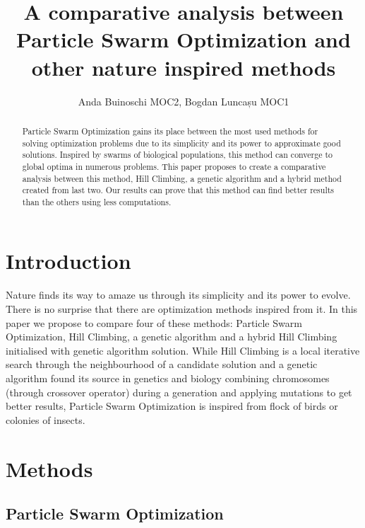 \documentclass{article}
\title{A comparative analysis between Particle Swarm Optimization and other nature inspired methods}
\author{Anda Buinoschi MOC2, Bogdan Luncașu MOC1 }
\date{}
\begin{document}
\maketitle

\begin{abstract}
Particle Swarm Optimization gains its place between the most used methods for solving optimization problems due to its simplicity and its power to approximate good solutions. Inspired by swarms of biological populations, this method can converge to global optima in numerous problems. This paper proposes to create a comparative analysis between this method, Hill Climbing, a genetic algorithm and a hybrid method created from last two. Our results can prove that this method can find better results than the others using less computations.
\end{abstract}

\section{Introduction}
Nature finds its way to amaze us through its simplicity and its power to evolve. There is no surprise that there are optimization methods inspired from it. In this paper we propose to compare four of these methods: Particle Swarm Optimization, Hill Climbing, a genetic algorithm and a hybrid Hill Climbing initialised with genetic algorithm solution. While Hill Climbing is a local iterative search through the neighbourhood of a candidate solution and a genetic algorithm found its source in genetics and biology combining chromosomes (through crossover operator) during a generation and applying mutations to get better results, Particle Swarm Optimization is inspired from flock of birds or colonies of insects.

\section{Methods}
\subsection{Particle Swarm Optimization}
\end{document}
